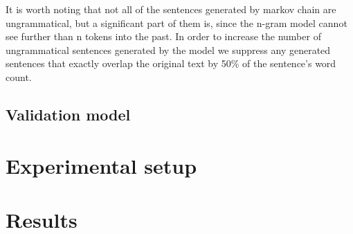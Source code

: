\documentclass[11pt,a4paper]{article}
\begin{document}
It is worth noting that not all of the sentences generated by markov chain are ungrammatical, but a significant part of them is, since the n-gram model cannot see further than n tokens into the past. In order to increase the number of ungrammatical sentences generated by the model we suppress any generated sentences that exactly overlap the original text by 50\% of the sentence's word count.

\subsection{Validation model}

\section{Experimental setup}
\label{sec:setup}

\section{Results}
\label{sec:results}


\end{document}
